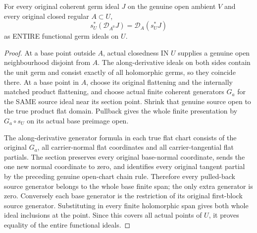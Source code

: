 \begin{theorem}
\label{hir:actual-open-zero-section-whole-derivative}
\leanok
For every original coherent germ ideal $J$ on the genuine open ambient $V$ and every original closed regular $A\subset U$,
\[
 s_U^*(\mathcal D_{A^0}J)=\mathcal D_A(s_U^*J)
\]
as ENTIRE functional germ ideals on $U$.
\end{theorem}
\begin{proof}
At a base point outside $A$, actual closedness IN $U$ supplies a genuine open neighbourhood disjoint from $A$. The along-derivative ideals on both sides contain the unit germ and consist exactly of all holomorphic germs, so they coincide there. At a base point in $A$, choose its original flattening and the internally matched product flattening, and choose actual finite coherent generators $G_a$ for the SAME source ideal near its section point. Shrink that genuine source open to the true product flat domain. Pullback gives the whole finite presentation by $G_a\circ s_U$ on its actual base preimage open.

The along-derivative generator formula in each true flat chart consists of the original $G_a$, all carrier-normal flat coordinates and all carrier-tangential flat partials. The section preserves every original base-normal coordinate, sends the one new normal coordinate to zero, and identifies every original tangent partial by the preceding genuine open-chart chain rule. Therefore every pulled-back source generator belongs to the whole base finite span; the only extra generator is zero. Conversely each base generator is the restriction of its original first-block source generator. Substituting in every finite holomorphic span gives both whole ideal inclusions at the point. Since this covers all actual points of $U$, it proves equality of the entire functional ideals.
\end{proof}

